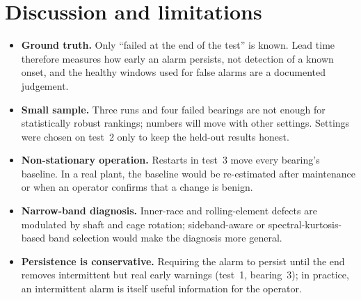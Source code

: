 \documentclass[11pt]{article}
\begin{document}
\section{Discussion and limitations}
\begin{itemize}
  \item \textbf{Ground truth.} Only ``failed at the end of the test'' is known. Lead time therefore
        measures how early an alarm persists, not detection of a known onset, and the healthy windows
        used for false alarms are a documented judgement.
  \item \textbf{Small sample.} Three runs and four failed bearings are not enough for statistically
        robust rankings; numbers will move with other settings. Settings were chosen on test~2 only to
        keep the held-out results honest.
  \item \textbf{Non-stationary operation.} Restarts in test~3 move every bearing's baseline. In a real
        plant, the baseline would be re-estimated after maintenance or when an operator confirms that a
        change is benign.
  \item \textbf{Narrow-band diagnosis.} Inner-race and rolling-element defects are modulated by
        shaft and cage rotation; sideband-aware or spectral-kurtosis-based band selection would make the
        diagnosis more general.
  \item \textbf{Persistence is conservative.} Requiring the alarm to persist until the end removes
        intermittent but real early warnings (test~1, bearing~3); in practice, an intermittent alarm is
        itself useful information for the operator.
\end{itemize}

\end{document}

